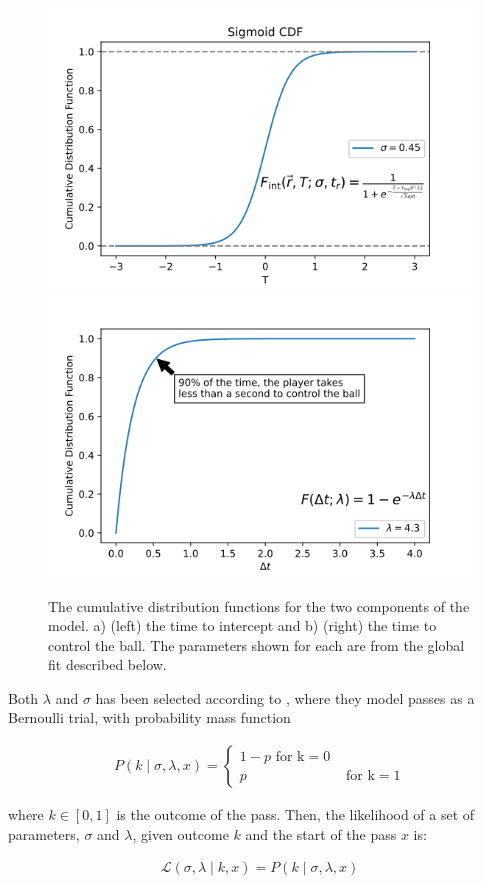 \documentclass[
  10pt,
  twoside,nohyper]{book}
\begin{document}
\begin{figure}[H]

{\centering \includegraphics[width=0.45\linewidth,]{imagenes/sigmoid_poster} \includegraphics[width=0.45\linewidth,]{imagenes/exp_poster} 

}

\caption{The cumulative distribution functions for the two components of the model. a) (left) the time to intercept and b) (right) the time to control the ball.    The parameters shown for each are from the global fit described below.}\label{fig:lambda}
\end{figure}

Both \(\lambda\) and \(\sigma\) has been selected according to \autocite{SpearmanFit}, where they model passes as a Bernoulli trial, with probability mass function

\begin{align*}
P(k \mid \sigma, \lambda, x)=\left\{\begin{array}{lr}
1-p \text { for } \mathrm{k}=0 \\
p & \text { for } \mathrm{k}=1
\end{array}\right.
\end{align*}

where \(k \in [0,1]\) is the outcome of the pass. Then, the likelihood of a set of\\
parameters, \(\sigma\) and \(\lambda\), given outcome \(k\) and the start of the pass \(x\) is:

\begin{align*}
\mathcal{L}(\sigma, \lambda \mid k, x)=P(k \mid \sigma, \lambda, x)
\end{align*}
\end{document}
